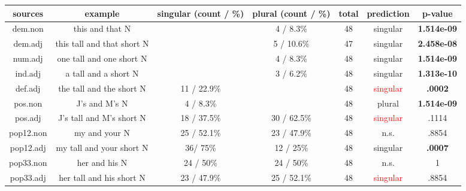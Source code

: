 \documentclass[
  11pt          %
  ,letterpaper  %
  ,center       %
  ,noupper      %
  ]{uconnthesis2}
\begin{document}
\begin{table}[h] \small \centering
{
\begin{tabular}{ | c | c | c | c | c | c | c |} \hline 
sources		&	example 				& 	singular (count / \%)			&	plural (count / \%)	&	total	&	prediction 	&	p-value\\ \hline
dem.non		&	this and that N			&	\cellcolor{yellow}{42 / 91.7\%}	&	4 / 8.3\%			&	48	&	singular	&	\textbf{1.514e-09}	\\ \hline
dem.adj		&	this tall and that short N 	&	\cellcolor{yellow}{44 / 89.4\%}	&	5 / 10.6\%			&	47	&	singular	&	\textbf{2.458e-08}\\ \hline
num.adj		&	one tall and one short N	&	\cellcolor{yellow}{44 / 91.7\%}	&	4 / 8.3\%			&	48	&	singular	&	\textbf{1.514e-09}\\ \hline
ind.adj		&	a tall and a short N		&	\cellcolor{yellow}{45 / 93.8\%}	&	3 / 6.2\%			&	48	&	singular	&	\textbf{1.313e-10}\\ \hline
def.adj		&	the tall and the short	N	&	11 / 22.9\%				&	\cellcolor{yellow}{37 / 77.1\%}	&	48	&	\textcolor{red}{singular} &	\textbf{.0002}\\ \hline
pos.non		&	J's and M's N			&	4 / 8.3\%					&	\cellcolor{yellow}{44 / 91.7\%}	&	48	&	plural &	\textbf{1.514e-09}	\\ \hline
pos.adj		&	J's tall and M's short	N	&	18 / 37.5\%				&	30 / 62.5\%		&	48	&	\textcolor{red}{singular} &	.1114	\\ \hline
pop12.non	&	my and your N			&	25 / 52.1\%				&	23 / 47.9\%		&	48	&	n.s.		& .8854	\\ \hline
pop12.adj		&	my tall and your short N	&	36/ \cellcolor{yellow}75\%		&	12 / 25\%			&	48	&	singular	& \textbf{.0007}		\\ \hline
pop33.non	&	her and his N			& 	24 / 50\%					&	24 / 50\%			&	48	&	n.s.		& 1	\\ \hline
pop33.adj		&	her tall and his short	N	&	23 / 47.9\%				&	25 / 52.1\%		&	48	&	\textcolor{red}{singular} &	.8854	\\ \hline


\end{tabular}}
\end{table}
\end{document}
